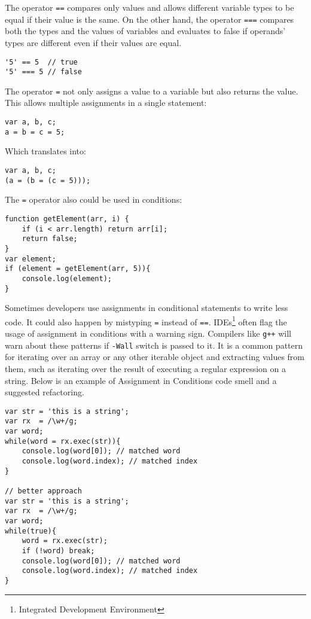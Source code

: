 The operator \texttt{==} compares only values and allows different variable types to be equal if their value is the same. On the other hand, the operator \texttt{===} compares both the types and the values of variables and evaluates to false if operands' types are different even if their values are equal.
\begin{lstlisting}
'5' == 5  // true
'5' === 5 // false
\end{lstlisting}

The operator \texttt{=} not only assigns a value to a variable but also returns the value. This allows multiple assignments in a single statement:
\begin{lstlisting}
var a, b, c;
a = b = c = 5;
\end{lstlisting}
Which translates into:
\begin{lstlisting}
var a, b, c;
(a = (b = (c = 5)));
\end{lstlisting}

The \texttt{=} operator also could be used in conditions:
\begin{lstlisting}
function getElement(arr, i) {
	if (i < arr.length) return arr[i];
	return false;
}
var element;
if (element = getElement(arr, 5)){
	console.log(element);
}
\end{lstlisting}

Sometimes developers use assignments in conditional statements to write less code. It could also happen by mistyping \texttt{=} instead of \texttt{==}. IDEs\footnote{Integrated Development Environment} often flag the usage of assignment in conditions with a warning sign. Compilers like \texttt{g++} will warn about these patterns if \texttt{-Wall} switch is passed to it. It is a common pattern for iterating over an array or any other iterable object and extracting values from them, such as iterating over the result of executing a regular expression on a string. Below is an example of Assignment in Conditions code smell and a suggested refactoring.
\begin{lstlisting}
var str = 'this is a string';
var rx  = /\w+/g;
var word;
while(word = rx.exec(str)){
    console.log(word[0]); // matched word
    console.log(word.index); // matched index
}

// better approach
var str = 'this is a string';
var rx  = /\w+/g;
var word;
while(true){
	word = rx.exec(str);
	if (!word) break;
    console.log(word[0]); // matched word
    console.log(word.index); // matched index
}
\end{lstlisting}

